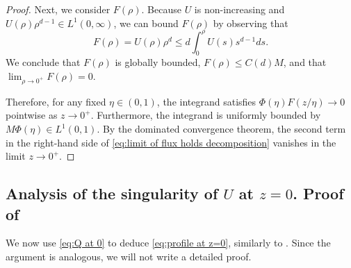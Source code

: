 \documentclass[a4paper]{article}
\theoremstyle{definition}
\begin{document}
\begin{proof}
  Next, we consider $F(\rho)$. Because $U$ is non-increasing and $U(\rho)\rho^{d-1} \in L^1(0,\infty)$, we can bound $F(\rho)$ by observing that
  \begin{equation*}
    F(\rho) = U(\rho) \rho^d \le d \int_0^\rho U(s) s^{d-1} ds.
  \end{equation*}
  We conclude that $F(\rho)$ is globally bounded, $F(\rho) \le C(d) M$, and that $\lim_{\rho \to 0^+} F(\rho) = 0$.

  Therefore, for any fixed $\eta \in (0,1)$, the integrand satisfies $\Phi(\eta) F(z/\eta) \to 0$ pointwise as $z \to 0^+$. Furthermore, the integrand is uniformly bounded by $M \Phi(\eta) \in L^1(0,1)$. By the dominated convergence theorem, the second term in the right-hand side of \eqref{eq:limit of flux holds decomposition}  vanishes in the limit $z \to 0^+$.
\end{proof}

%
%
%
%
%
%
%
%

%

\subsection{Analysis of the singularity of $U$ at $z = 0$. Proof of }
\label{sec:U at z=0}
We now use \eqref{eq:Q at 0} to deduce \eqref{eq:profile at z=0}, similarly to . Since the argument is analogous, we will not write a detailed proof.
\end{document}
